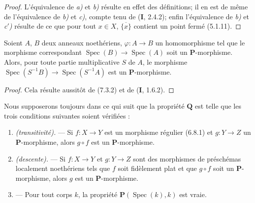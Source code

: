 \begin{proof}
L'équivalence de \emph{a)} et \emph{b)} résulte en effet des définitions; il en est de
même de l'équivalence de \emph{b)} et \emph{c)}, compte tenu de (\textbf{I}, 2.4.2); enfin
l'équivalence de \emph{b)} et \emph{c$'$)} résulte de ce que pour tout $x\in X$,
$\overline{\{x\}}$ contient un point fermé (5.1.11).
\end{proof}

\begin{corollary}[7.3.3]
\label{IV.2.s7.3.3-fr}
Soient $A$, $B$ deux anneaux noethériens, $\varphi:A\to B$ un homomorphisme
tel que le morphisme correspondant
$\operatorname{Spec}(B)\to\operatorname{Spec}(A)$ soit un
$\boldsymbol P$-morphisme. Alors, pour toute partie multiplicative $S$ de
$A$, le morphisme
$\operatorname{Spec}(S^{-1}B)\to\operatorname{Spec}(S^{-1}A)$ est un
$\boldsymbol P$-morphisme.
\end{corollary}

\begin{proof}
Cela résulte aussitôt de (7.3.2) et de (\textbf{I}, 1.6.2).
\end{proof}

\begin{env}[7.3.4]
\label{IV.2.s7.3.4-fr}
Nous supposerons toujours dans ce qui suit que la propriété
$\boldsymbol Q$ est telle que les trois conditions suivantes soient
vérifiées :
\begin{enumerate}
\item[$(\mathrm P_{\mathrm I})$] \emph{(transitivité).} --- Si
$f:X\to Y$ est un morphisme régulier (6.8.1) et $g:Y\to Z$ un
$\boldsymbol P$-morphisme, alors $g\circ f$ est un
$\boldsymbol P$-morphisme.
\item[$(\mathrm P_{\mathrm{II}})$] \emph{(descente).} --- Si
$f:X\to Y$ et $g:Y\to Z$ sont des morphismes de préschémas localement
noethériens tels que $f$ soit fidèlement plat et que $g\circ f$ soit un
$\boldsymbol P$-morphisme, alors $g$ est un $\boldsymbol P$-morphisme.
\item[$(\mathrm P_{\mathrm{III}})$.] --- Pour tout corps $k$, la propriété
$\boldsymbol P(\operatorname{Spec}(k),k)$ est vraie.
\end{enumerate}
\end{env}

